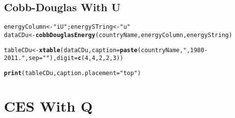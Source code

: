 \documentclass[preprint,authoryear,12pt]{elsarticle}\usepackage{graphicx, color}
\makeatletter
\newcommand{\hlfunctioncall}[1]{\textcolor[rgb]{0.501960784313725,0,0.329411764705882}{\textbf{#1}}}%
\newcommand{\hlstring}[1]{\textcolor[rgb]{0.6,0.6,1}{#1}}%
\newenvironment{kframe}{%
 \def\at@end@of@kframe{}%
 \ifinner\ifhmode%
  \def\at@end@of@kframe{\end{minipage}}%
  \begin{minipage}{\columnwidth}%
 \fi\fi%
 \def\FrameCommand##1{\hskip\@totalleftmargin \hskip-\fboxsep
 \colorbox{shadecolor}{##1}\hskip-\fboxsep
     \hskip-\linewidth \hskip-\@totalleftmargin \hskip\columnwidth}%
 \MakeFramed {\advance\hsize-\width
   \@totalleftmargin\z@ \linewidth\hsize
   \@setminipage}}%
 {\par\unskip\endMakeFramed%
 \at@end@of@kframe}
\newenvironment{knitrout}{}{} %
\makeatother
\begin{document}
\subsection{Cobb-Douglas With U}

\begin{knitrout}
\color{fgcolor}\begin{kframe}
\begin{alltt}
energyColumn <- \hlstring{"iU"}; energySTring <- \hlstring{"u"}
dataCDu <- \hlfunctioncall{cobbDouglasEnergy}(countryName, energyColumn, energyString)
\end{alltt}


{\ttfamily\noindent\bfseries\color{errorcolor}{Error: could not find function "cobbDouglasEnergy"}}\begin{alltt}
tableCDu <- \hlfunctioncall{xtable}(dataCDu, caption=\hlfunctioncall{paste}(countryName, \hlstring{", 1980-2011."}, sep=\hlstring{""}), digit = \hlfunctioncall{c}(4, 4, 2, 2, 3))
\end{alltt}


{\ttfamily\noindent\bfseries\color{errorcolor}{Error: could not find function "xtable"}}\end{kframe}
\end{knitrout}


\begin{kframe}
\begin{alltt}
\hlfunctioncall{print}(tableCDu, caption.placement=\hlstring{"top"})
\end{alltt}


{\ttfamily\noindent\bfseries\color{errorcolor}{Error: error in evaluating the argument 'x' in selecting a method for function 'print': Error: object 'tableCDu' not found}}\end{kframe}


\section{CES With Q}
\end{document}
